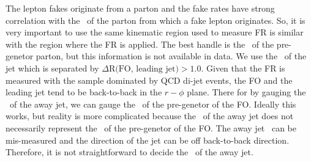The lepton fakes originate from a parton and the fake rates have strong 
correlation with the \pt\ of the parton from which a fake lepton originates.
So, it is very important to use the same kinematic region used to measure FR 
is similar with the region where the FR is applied. The best handle is the 
\pt\ of the pre-genetor parton, but this information is not available in data.   
We use the \pt\ of the jet which is separated by $\Delta \textrm{R(FO, leading jet)} > 1.0$.  
Given that the FR is measured with the sample dominated by QCD di-jet events, 
the FO and the leading jet tend to be back-to-back in the $r-\phi$ plane.
There for by gauging the \pt\ of the away jet, we can gauge the \pt\ 
of the pre-genetor of the FO. Ideally this works, but reality is more 
complicated because the \pt\ of the away jet does not necessarily represent 
the \pt\ of the pre-genetor of the FO. The away jet \pt\ can be mis-measured 
and the direction of the jet can be off back-to-back direction.  
Therefore, it is not straightforward to decide the \pt\ of the away jet. 


